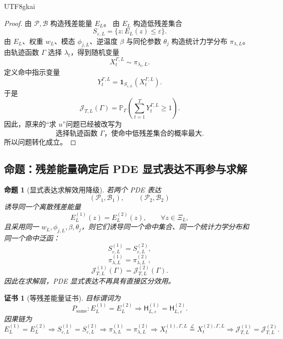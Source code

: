 \documentclass[12pt]{article}
\newtheorem{proposition}{命题}[section]
\newtheorem{Certificate}{证书}[section]
\begin{document}
\begin{CJK*}{UTF8}{gkai}
\begin{proof}
由 \(\mathcal P,\mathcal B\) 构造残差能量 \(E_L\)。
由 \(E_L\) 构造低残差集合
\[
  S_{\varepsilon,L}
  =
  \{z:E_L(z)\le\varepsilon\}.
\]
由 \(E_L\)、权重 \(w_L\)、模态 \(\phi_{j,L}\)、逆温度 \(\beta\) 与同伦参数
\(\theta_j\) 构造统计力学分布 \(\pi_{\lambda,L}\)。
由轨迹函数 \(\Gamma\) 选择 \(\lambda_t\)，得到随机变量
\[
  X_t^{\Gamma,L}\sim\pi_{\lambda_t,L}.
\]
定义命中指示变量
\[
  Y_t^{\Gamma,L}
  =
  \mathbf 1_{S_{\varepsilon,L}}(X_t^{\Gamma,L}).
\]
于是
\[
  \mathcal J_{T,L}(\Gamma)
  =
  \mathbb P_\Gamma
  \left(
  \sum_{t=1}^{T}Y_t^{\Gamma,L}\ge1
  \right).
\]
因此，原来的“求 \(u\)”问题已经被改写为
\[
  \text{选择轨迹函数 }\Gamma
  \text{，使命中低残差集合的概率最大}.
\]
所以问题转化成立。
\end{proof}

\subsection{命题：残差能量确定后 PDE 显式表达不再参与求解}
\label{subsec:tex55-explicit-expression-irrelevance}

\begin{proposition}[显式表达求解效用降级]
\label{prop:tex55-explicit-expression-demoted}
若两个 PDE 表达
\[
  (\mathcal P_1,\mathcal B_1),
  \qquad
  (\mathcal P_2,\mathcal B_2)
\]
诱导同一个离散残差能量
\[
  E_L^{(1)}(z)=E_L^{(2)}(z),
  \qquad
  \forall z\in\Xi_L,
\]
且采用同一 \(w_L,\phi_{j,L},\beta,\theta_j\)，则它们诱导同一个命中集合、同一个统计力学分布和同一个命中泛函：
\[
  S_{\varepsilon,L}^{(1)}
  =
  S_{\varepsilon,L}^{(2)},
\]
\[
  \pi_{\lambda,L}^{(1)}
  =
  \pi_{\lambda,L}^{(2)},
\]
\[
  \mathcal J_{T,L}^{(1)}(\Gamma)
  =
  \mathcal J_{T,L}^{(2)}(\Gamma).
\]
因此在求解层，PDE 显式表达不再具有直接区分效用。
\end{proposition}

\begin{Certificate}[等残差能量证书]
\label{cert:tex55-equal-energy-same-hit-problem}
目标谓词为
\[
  P_{\mathrm{same}}:
  E_L^{(1)}=E_L^{(2)}
  \Longrightarrow
  \mathsf H_{L,\varepsilon}^{(1)}
  =
  \mathsf H_{L,\varepsilon}^{(2)}.
\]
因果链为
\[
  E_L^{(1)}=E_L^{(2)}
  \Longrightarrow
  S_{\varepsilon,L}^{(1)}=S_{\varepsilon,L}^{(2)}
  \Longrightarrow
  \pi_{\lambda,L}^{(1)}=\pi_{\lambda,L}^{(2)}
  \Longrightarrow
  X_t^{(1),\Gamma,L}\stackrel{\mathcal L}{=}X_t^{(2),\Gamma,L}
  \Longrightarrow
  \mathcal J_{T,L}^{(1)}=\mathcal J_{T,L}^{(2)}.
\]
\end{Certificate}


\end{CJK*}
\end{document}

